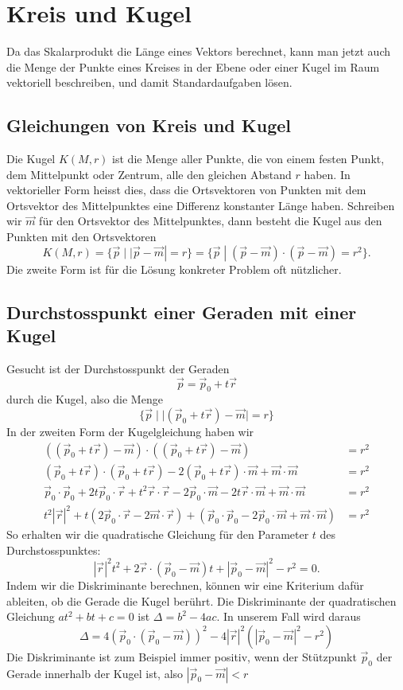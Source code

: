 %
%
%
\section{Kreis und Kugel\label{section:kreisundkugel}}
Da das Skalarprodukt die Länge eines Vektors berechnet, kann man
jetzt auch die Menge der Punkte eines Kreises in der Ebene
oder einer Kugel im Raum vektoriell beschreiben, und damit Standardaufgaben
lösen.

%
%
\subsection{Gleichungen von Kreis und Kugel}
Die Kugel $K(M,r)$ ist die Menge aller Punkte, die von einem festen Punkt, dem
Mittelpunkt oder Zentrum, alle den gleichen Abstand $r$ haben.
In vektorieller
Form heisst dies, dass die Ortsvektoren von Punkten mit dem Ortsvektor des
Mittelpunktes eine Differenz konstanter Länge haben.
Schreiben wir $\vec m$
für den Ortsvektor des Mittelpunktes, dann besteht die Kugel aus den
Punkten mit den Ortsvektoren
\[
K(M,r)
=
\{\vec p\;| \;|\vec p-\vec m|=r\}
=
\{\vec p\;| \;(\vec p-\vec m)\cdot(\vec p-\vec m)=r^2\}.
\]
Die zweite Form ist für die Lösung konkreter Problem oft nützlicher.

%
%
\subsection{Durchstosspunkt einer Geraden mit einer Kugel
\label{durchstosspunktkugel}}
Gesucht ist der Durchstosspunkt der Geraden
\[
\vec p=\vec p_0+t\vec r
\]
durch die Kugel, also die Menge
\[
\{\vec p\;| \;|(\vec p_0+t\vec r)-\vec m|=r\}
\]
In der zweiten Form der Kugelgleichung haben wir
\begin{align*}
((\vec p_0+t\vec r)-\vec m)
\cdot
((\vec p_0+t\vec r)-\vec m)&=r^2
\\
(\vec p_0+t\vec r)
\cdot
(\vec p_0+t\vec r)
-2
(\vec p_0+t\vec r)\cdot \vec m
+\vec m\cdot\vec m&=r^2
\\
\vec p_0\cdot\vec p_0
+2t\vec p_0\cdot\vec r
+t^2\vec r\cdot\vec r
-2\vec p_0\cdot\vec m
-2t\vec r\cdot\vec m
+\vec m\cdot\vec m&=r^2
\\
t^2|\vec r|^2
+t(2\vec p_0\cdot\vec r-2\vec m\cdot\vec r)
+(\vec p_0\cdot\vec p_0-2\vec p_0\cdot\vec m+\vec m\cdot\vec m)&=r^2
\end{align*}
So erhalten wir die quadratische Gleichung für den Parameter $t$
des Durchstosspunktes:
\[
|\vec r|^2t^2
+2\vec r\cdot(\vec p_0-\vec m)t
+|\vec p_0-\vec m|^2-r^2 =0.
\]
Indem wir die Diskriminante berechnen,  können wir eine Kriterium
dafür ableiten, ob die Gerade die Kugel berührt.
Die Diskriminante
der quadratischen Gleichung $at^2+bt+c=0$ ist $\Delta = b^2-4ac$.
In unserem
Fall wird daraus
\[
\Delta
=
4(\vec p_0\cdot(\vec p_0-\vec m))^2-
4|\vec r|^2(
|\vec p_0-\vec m|^2-r^2
)
\]
Die Diskriminante ist zum Beispiel immer positiv, wenn der Stützpunkt
$\vec p_0$
der Gerade innerhalb der Kugel ist, also $|\vec p_0-\vec m|<r$


